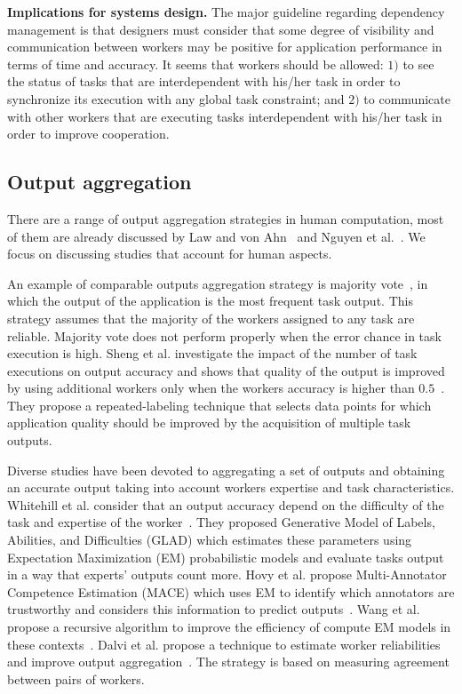 \documentclass[11pt]{bmc_article_s50}
\begin{document}
\textbf{Implications for systems design.} The major guideline regarding dependency management is that designers must consider that some degree of visibility and communication between workers may be positive for application performance in terms of time and accuracy. It seems that workers should be allowed: $1)$ to see the status of tasks that are interdependent with his/her task in order to synchronize its execution with any global task constraint; and $2)$ to communicate with other workers that are executing tasks interdependent with his/her task in order to improve cooperation.

\subsection{Output aggregation}

There are a range of output aggregation strategies in human computation, most of them are already discussed by Law and von Ahn~\cite{Law:Book:2011} and Nguyen et al.~\cite{Nguyen:WISE:2013}. We focus on discussing studies that account for human aspects.

An example of comparable outputs aggregation strategy is majority vote~\cite{Barowy:2012,Little2010}, in which the output of the application is the most frequent task output. This strategy assumes that the majority of the workers assigned to any task are reliable. Majority vote does not perform properly when the error chance in task execution is high. Sheng et al. investigate the impact of the number of task executions on output accuracy and shows that quality of the output is improved by using additional workers only when the workers accuracy is higher than $0.5$~\cite{Sheng:KDD:2008}. They propose a repeated-labeling technique that selects data points for which application quality should be improved by the acquisition of multiple task outputs.

Diverse studies have been devoted to aggregating a set of outputs and obtaining an accurate output taking into account workers expertise and task characteristics. Whitehill et al. consider that an output accuracy depend on the difficulty of the task and expertise of the worker~\cite{whitehill:ANIPS:2009}. They proposed Generative Model of Labels, Abilities, and Difficulties (GLAD) which estimates these parameters using Expectation Maximization (EM) probabilistic models and evaluate tasks output in a way that experts' outputs count more. Hovy et al. propose Multi-Annotator Competence Estimation (MACE) which uses EM to identify which annotators are trustworthy and considers this information to predict outputs~\cite{Hovy:NAACL-HLT:2013}. Wang et al. propose a recursive algorithm to improve the efficiency of compute EM models in these contexts~\cite{Wang:2013}. {\color{black}Dalvi et al. propose a technique to estimate worker reliabilities and improve output aggregation~\cite{Dalvi:2013}. The strategy is based on measuring agreement between pairs of workers.}
\end{document}
